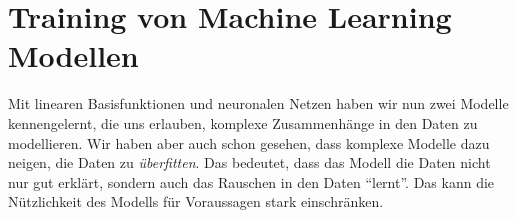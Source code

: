 






\section{Training von Machine Learning Modellen}
Mit linearen Basisfunktionen und neuronalen Netzen haben wir nun zwei Modelle kennengelernt, die uns erlauben, komplexe Zusammenhänge in den Daten zu modellieren. Wir haben aber auch schon gesehen, dass komplexe Modelle dazu neigen, die Daten zu \emph{überfitten}. Das bedeutet, dass das Modell die Daten nicht nur gut erklärt, sondern auch das Rauschen in den Daten ``lernt''. Das kann die Nützlichkeit des Modells für Voraussagen stark einschränken.

